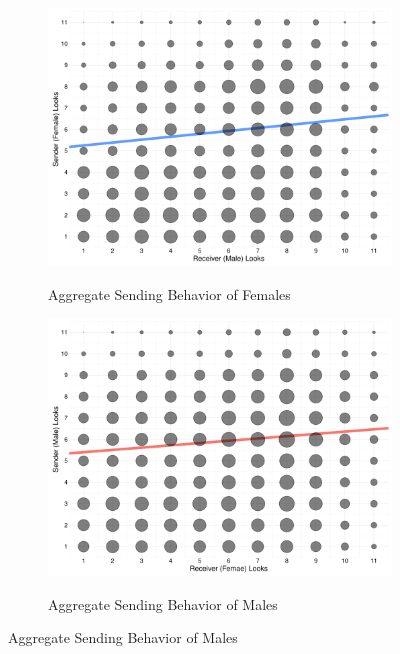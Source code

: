 \begin{figure}[!htb]
  \centering
  \caption{}
  \begin{subfigure}[b]{0.49\textwidth}
    \caption{Aggregate Sending Behavior of Females}
    \includegraphics[width=\textwidth]{dotplot_female.pdf}
    \label{fig:dotplot_female}
  \end{subfigure}
  \hfill
  \begin{subfigure}[b]{0.49\textwidth}
    \caption{Aggregate Sending Behavior of Males}
    \includegraphics[width=\textwidth]{dotplot_male.pdf}
    \label{fig:dotplot_male}
  \end{subfigure}
\end{figure}

